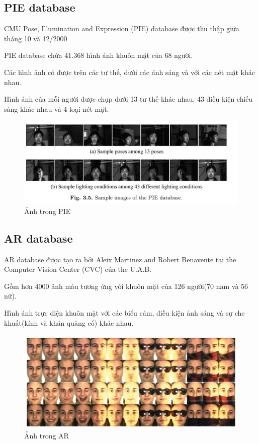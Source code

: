 \documentclass[a4paper, 12pt]{article}
\begin{document}
\subsection{PIE database}
CMU Pose, Illumination and Expression (PIE) database được thu thập giữa tháng 10 và 12/2000

PIE database chứa 41.368 hình ảnh khuôn mặt của 68 người.

Các hình ảnh có được trên các tư thế, dưới các ánh sáng và với các nét mặt khác nhau. 

Hình ảnh của mỗi người được chụp dưới 13 tư thế khác nhau, 43 điều kiện chiếu sáng khác nhau và 4 loại nét mặt.

    \begin{figure}[H]
        \begin{center}
            \includegraphics[scale=0.35]{img/PIE.png}
            \caption{Ảnh trong PIE}
        \end{center}
    \end{figure}

\subsection{AR database}
AR database được tạo ra bởi Aleix Martinez and Robert Benavente tại the Computer Vision Center (CVC) của the U.A.B.

Gồm hơn 4000 ảnh màu tương ứng với khuôn mặt của 126 người(70 nam và 56 nữ). 

Hình ảnh trực diện khuôn mặt với các biểu cảm, điều kiện ảnh sáng và sự che khuất(kính và khăn quàng cổ) khác nhau.

    \begin{figure}[H]
        \begin{center}
            \includegraphics[scale=0.5]{img/AR.png}
            \caption{Ảnh trong AR}
        \end{center}
    \end{figure}
\end{document}
